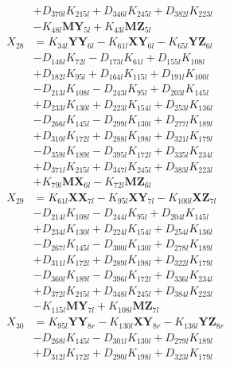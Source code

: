 \begin{multicols}{2}
\begin{align}
&+ D_{370l}K_{215l} + D_{346l}K_{245l} + D_{382l}K_{223l}  \nonumber \\
&- K_{48l}\mathbf{MY}_{5l} + K_{43l}\mathbf{MZ}_{5l} \nonumber \\
X_{28} &= K_{34l}\mathbf{YY}_{6l} - K_{61l}\mathbf{XY}_{6l} - K_{65l}\mathbf{YZ}_{6l}  \nonumber \\
&- D_{146l}K_{72l} - D_{173l}K_{61l} + D_{155l}K_{108l}  \nonumber \\
&+ D_{182l}K_{95l} + D_{164l}K_{115l} + D_{191l}K_{100l}  \nonumber \\
&- D_{213l}K_{108l} - D_{243l}K_{95l} + D_{203l}K_{145l}  \nonumber \\
&+ D_{233l}K_{130l} + D_{223l}K_{154l} + D_{253l}K_{136l}  \nonumber \\
&- D_{266l}K_{145l} - D_{299l}K_{130l} + D_{277l}K_{189l}  \nonumber \\
&+ D_{310l}K_{172l} + D_{288l}K_{198l} + D_{321l}K_{179l}  \nonumber \\
&- D_{359l}K_{189l} - D_{395l}K_{172l} + D_{335l}K_{234l}  \nonumber \\
&+ D_{371l}K_{215l} + D_{347l}K_{245l} + D_{383l}K_{223l}  \nonumber \\
&+ K_{79l}\mathbf{MX}_{6l} - K_{72l}\mathbf{MZ}_{6l} \nonumber \\
X_{29} &= K_{61l}\mathbf{XX}_{7l} - K_{95l}\mathbf{XY}_{7l} - K_{100l}\mathbf{XZ}_{7l}  \nonumber \\
&- D_{214l}K_{108l} - D_{244l}K_{95l} + D_{204l}K_{145l}  \nonumber \\
&+ D_{234l}K_{130l} + D_{224l}K_{154l} + D_{254l}K_{136l}  \nonumber \\
&- D_{267l}K_{145l} - D_{300l}K_{130l} + D_{278l}K_{189l}  \nonumber \\
&+ D_{311l}K_{172l} + D_{289l}K_{198l} + D_{322l}K_{179l}  \nonumber \\
&- D_{360l}K_{189l} - D_{396l}K_{172l} + D_{336l}K_{234l}  \nonumber \\
&+ D_{372l}K_{215l} + D_{348l}K_{245l} + D_{384l}K_{223l}  \nonumber \\
&- K_{115l}\mathbf{MY}_{7l} + K_{108l}\mathbf{MZ}_{7l} \nonumber \\
X_{30} &= K_{95l}\mathbf{YY}_{8r} - K_{130l}\mathbf{XY}_{8r} - K_{136l}\mathbf{YZ}_{8r}  \nonumber \\
&- D_{268l}K_{145l} - D_{301l}K_{130l} + D_{279l}K_{189l}  \nonumber \\
&+ D_{312l}K_{172l} + D_{290l}K_{198l} + D_{323l}K_{179l}  \nonumber \\

\end{align}
\end{multicols}

